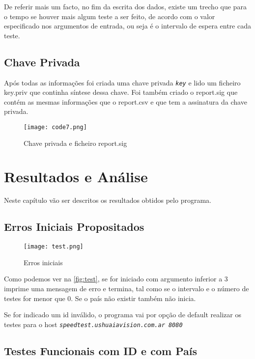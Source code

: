 \documentclass{report}
\begin{document}
De referir mais um facto, no fim da escrita dos dados, existe um trecho que para o tempo se houver mais algum teste a ser feito, de acordo com o valor especificado nos argumentos de entrada, ou seja é o intervalo de espera entre cada teste.

\section{Chave Privada}

Após todas as informações foi criada uma chave privada {\itshape \texttt{key}} e lido um ficheiro key.priv que continha síntese dessa chave. Foi também criado o report.sig que contém as mesmas informações que o report.csv e que tem a assinatura da chave privada.


\begin{figure}[h]
\center %
\texttt{[image: code7.png]}
\caption{Chave privada e ficheiro report.sig}
\label{fig:code7}
\end{figure}





 \chapter{Resultados e Análise}
\label{chap.resultados}
Neste capítulo vão ser descritos os resultados obtidos pelo programa.
\section{Erros Iniciais Propositados}

\begin{figure}[h]
\center %
\texttt{[image: test.png]}
\caption{Erros iniciais}
\label{fig:test}
\end{figure}

Como podemos ver na \autoref{fig:test}, se for iniciado com argumento inferior a 3 imprime uma mensagem de erro e termina, tal como se o intervalo e o número de testes for menor que 0. Se o país não existir também não inicia.

Se for indicado um id inválido, o programa vai por opção de default realizar os testes para o host {\itshape \texttt{speedtest.ushuaiavision.com.ar 8080}}

\section{Testes Funcionais com ID e com País}
 
\end{document}
